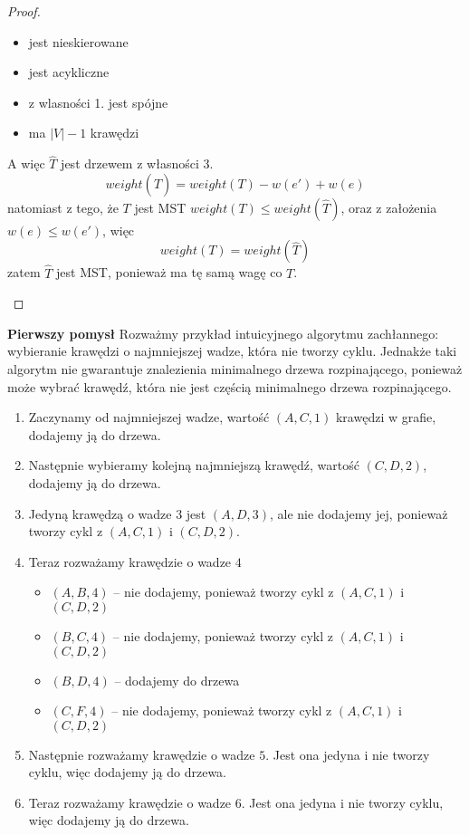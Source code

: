 \documentclass[11pt,a4paper]{article}
\begin{document}
\begin{itemize}
\begin{proof}
\begin{enumerate}
                    \begin{itemize}
                        \item jest nieskierowane
                        \item jest acykliczne
                        \item z wlasności 1. jest spójne
                        \item ma $|V|-1$ krawędzi
                    \end{itemize}
                    A więc $\hat T$ jest drzewem z własności 3.
                    \[
                        weight(\hat T) = weight(T) - w(e') + w(e)
                    \]
                    natomiast z tego, że $T$ jest MST $weight(T) \leq weight(\hat T)$, oraz z założenia $w(e) \leq w(e')$, więc
                    \[
                        weight(T) = weight(\hat T)
                    \]
                    zatem $\hat T$ jest MST, ponieważ ma tę samą wagę co $T$.
            \end{enumerate}
        \end{proof}
\end{itemize}

\textbf{Pierwszy pomysł} Rozważmy przykład intuicyjnego algorytmu zachłannego: wybieranie krawędzi o najmniejszej wadze, która nie tworzy cyklu. Jednakże taki algorytm nie gwarantuje znalezienia minimalnego drzewa rozpinającego, ponieważ może wybrać krawędź, która nie jest częścią minimalnego drzewa rozpinającego.

\begin{enumerate}
    \item Zaczynamy od najmniejszej wadze, wartość $(A, C, 1)$ krawędzi w grafie, dodajemy ją do drzewa.
    \item Następnie wybieramy kolejną najmniejszą krawędź, wartość $(C, D, 2)$, dodajemy ją do drzewa.
    \item Jedyną krawędzą o wadze $3$ jest $(A, D, 3)$, ale nie dodajemy jej, ponieważ tworzy cykl z $(A, C, 1)$ i $(C, D, 2)$.
    \item Teraz rozważamy krawędzie o wadze $4$
        \begin{itemize}
            \item $(A, B, 4)$ -- nie dodajemy, ponieważ tworzy cykl z $(A, C, 1)$ i $(C, D, 2)$
            \item $(B, C, 4)$ -- nie dodajemy, ponieważ tworzy cykl z $(A, C, 1)$ i $(C, D, 2)$
            \item $(B, D, 4)$ -- dodajemy do drzewa
            \item $(C, F, 4)$ -- nie dodajemy, ponieważ tworzy cykl z $(A, C, 1)$ i $(C, D, 2)$
        \end{itemize}
    \item Następnie rozważamy krawędzie o wadze $5$. Jest ona jedyna i nie tworzy cyklu, więc dodajemy ją do drzewa.
    \item Teraz rozważamy krawędzie o wadze $6$. Jest ona jedyna i nie tworzy cyklu, więc dodajemy ją do drzewa.
\end{enumerate}
\end{document}

